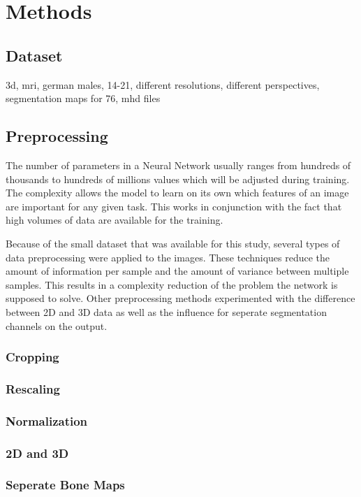 \section{Methods}

\subsection{Dataset}

3d, mri, german males, 14-21, different resolutions, different perspectives, segmentation maps for 76, mhd files



\subsection{Preprocessing}

The number of parameters in a Neural Network usually ranges from hundreds of thousands to hundreds of millions values which will be adjusted during training. The complexity allows the model to learn on its own which features of an image are important for any given task. This works in conjunction with the fact that high volumes of data are available for the training.

Because of the small dataset that was available for this study, several types of data preprocessing were applied to the images. These techniques reduce the amount of information per sample and the amount of variance between multiple samples. This results in a complexity reduction of the problem the network is supposed to solve. Other preprocessing methods experimented with the difference between 2D and 3D data as well as the influence for seperate segmentation channels on the output.

\subsubsection{Cropping}
\subsubsection{Rescaling}
\subsubsection{Normalization}
\subsubsection{2D and 3D}
\subsubsection{Seperate Bone Maps}

